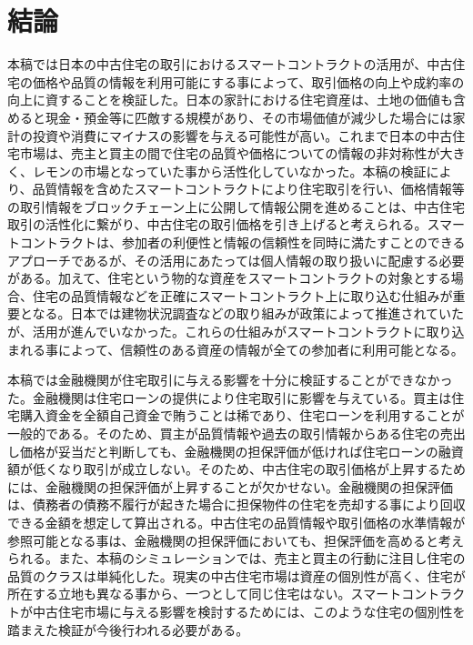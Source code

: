 \documentclass[a4paper,fontsize=11pt,report,notitlepage,line_length=38zw,number_of_lines=40]{jlreq}
\begin{document}
\chapter{結論}
本稿では日本の中古住宅の取引におけるスマートコントラクトの活用が、中古住宅の価格や品質の情報を利用可能にする事によって、取引価格の向上や成約率の向上に資することを検証した。日本の家計における住宅資産は、土地の価値も含めると現金・預金等に匹敵する規模があり、その市場価値が減少した場合には家計の投資や消費にマイナスの影響を与える可能性が高い。これまで日本の中古住宅市場は、売主と買主の間で住宅の品質や価格についての情報の非対称性が大きく、レモンの市場となっていた事から活性化していなかった。本稿の検証により、品質情報を含めたスマートコントラクトにより住宅取引を行い、価格情報等の取引情報をブロックチェーン上に公開して情報公開を進めることは、中古住宅取引の活性化に繋がり、中古住宅の取引価格を引き上げると考えられる。スマートコントラクトは、参加者の利便性と情報の信頼性を同時に満たすことのできるアプローチであるが、その活用にあたっては個人情報の取り扱いに配慮する必要がある。加えて、住宅という物的な資産をスマートコントラクトの対象とする場合、住宅の品質情報などを正確にスマートコントラクト上に取り込む仕組みが重要となる。日本では建物状況調査などの取り組みが政策によって推進されていたが、活用が進んでいなかった。これらの仕組みがスマートコントラクトに取り込まれる事によって、信頼性のある資産の情報が全ての参加者に利用可能となる。

本稿では金融機関が住宅取引に与える影響を十分に検証することができなかった。金融機関は住宅ローンの提供により住宅取引に影響を与えている。買主は住宅購入資金を全額自己資金で賄うことは稀であり、住宅ローンを利用することが一般的である。そのため、買主が品質情報や過去の取引情報からある住宅の売出し価格が妥当だと判断しても、金融機関の担保評価が低ければ住宅ローンの融資額が低くなり取引が成立しない。そのため、中古住宅の取引価格が上昇するためには、金融機関の担保評価が上昇することが欠かせない。金融機関の担保評価は、債務者の債務不履行が起きた場合に担保物件の住宅を売却する事により回収できる金額を想定して算出される。中古住宅の品質情報や取引価格の水準情報が参照可能となる事は、金融機関の担保評価においても、担保評価を高めると考えられる。また、本稿のシミュレーションでは、売主と買主の行動に注目し住宅の品質のクラスは単純化した。現実の中古住宅市場は資産の個別性が高く、住宅が所在する立地も異なる事から、一つとして同じ住宅はない。スマートコントラクトが中古住宅市場に与える影響を検討するためには、このような住宅の個別性を踏まえた検証が今後行われる必要がある。




\end{document}
